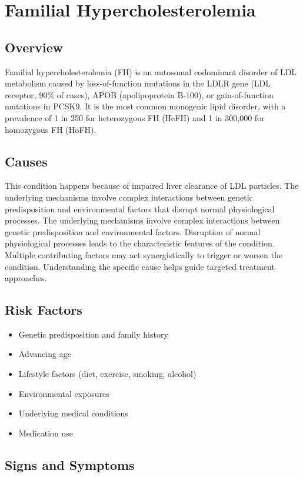\chapter{Familial Hypercholesterolemia}
\label{sec:Familial Hypercholesterolemia}

\section{Overview}
Familial hypercholesterolemia (FH) is an autosomal codominant disorder of LDL metabolism caused by loss-of-function mutations in the LDLR gene (LDL receptor, 90\% of cases), APOB (apolipoprotein B-100), or gain-of-function mutations in PCSK9. It is the most common monogenic lipid disorder, with a prevalence of 1 in 250 for heterozygous FH (HeFH) and 1 in 300,000 for homozygous FH (HoFH).
\section{Causes}
This condition happens because of impaired liver clearance of LDL particles. The underlying mechanisms involve complex interactions between genetic predisposition and environmental factors that disrupt normal physiological processes. The underlying mechanisms involve complex interactions between genetic predisposition and environmental factors. Disruption of normal physiological processes leads to the characteristic features of the condition. Multiple contributing factors may act synergistically to trigger or worsen the condition. Understanding the specific cause helps guide targeted treatment approaches.
\section{Risk Factors}


\begin{itemize}[noitemsep]
  \item Genetic predisposition and family history
  \item Advancing age
  \item Lifestyle factors (diet, exercise, smoking, alcohol)
  \item Environmental exposures
  \item Underlying medical conditions
  \item Medication use
\end{itemize}
\section{Signs and Symptoms}

